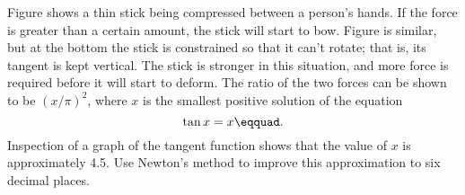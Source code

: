 Figure  shows a thin stick 
being compressed between a person's
hands. If the force is greater than a certain amount,
the stick will start to bow. Figure 
is similar, but at the bottom the stick is constrained
so that it can't rotate; that is, its tangent is kept vertical.
The stick is stronger in this situation, and more force
is required before it will start to deform. The ratio of the
two forces can be shown to be $(x/\pi)^2$, where $x$ is the
smallest positive solution of the equation
\begin{equation*}
  \tan x = x\eqquad.
\end{equation*}
Inspection of a graph of the tangent function shows that the
value of $x$ is approximately 4.5. Use Newton's method to improve
this approximation to six decimal places.\answercheck
